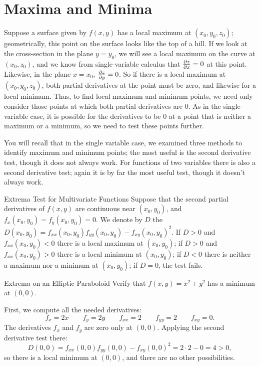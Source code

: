 \section{Maxima and Minima}\label{sec:MultivariateMaximaMinima}

Suppose a surface given by $f(x,y)$ has a local maximum at
$(x_0,y_0,z_0)$; geometrically, this point on the surface looks like
the top of a hill. If we look at the cross-section in the plane
$y=y_0$, we will see a local maximum on the curve at $(x_0,z_0)$, and
we know from single-variable calculus that ${\partial z\over\partial x}=0$
at this point. Likewise, in the plane $x=x_0$, ${\partial
  z\over\partial y}=0$. So if there is a local maximum at
$(x_0,y_0,z_0)$, both partial derivatives at the point must be zero,
and likewise for a local minimum. Thus, to find local maximum and
minimum points, we need only consider those points at which both
partial derivatives are 0. As in the single-variable case, it is
possible for the derivatives to be 0 at a point that is neither a
maximum or a minimum, so we need to test these points further.

You will recall that in the single variable case, we examined three
methods to identify maximum and minimum points; the most useful is the
second derivative test, though it does not always work. For functions
of two variables there is also a second derivative test; again it is
by far the most useful test, though it doesn't always work.

\begin{theorem}{Extrema Test for Multivariate Functions}{}
Suppose that the second partial derivatives of $f(x,y)$ are
continuous near $(x_0,y_0)$, and $f_x(x_0,y_0)=f_y(x_0,y_0)=0$.
We denote by $D$ the 
$D(x_0,y_0)=f_{xx}(x_0,y_0)f_{yy}(x_0,y_0)-f_{xy}(x_0,y_0)^2$.
If $D>0$ and $f_{xx}(x_0,y_0)<0$ there is a local maximum at $(x_0,y_0)$;
if $D>0$ and $f_{xx}(x_0,y_0)>0$ there is a local minimum at $(x_0,y_0)$;
if $D<0$ there is neither a maximum nor a minimum at $(x_0,y_0)$;
if $D=0$, the test fails.
\end{theorem}

\begin{example}{Extrema on an Elliptic Paraboloid}{}
Verify that $f(x,y)=x^2+y^2$ has a minimum at $(0,0)$.
\end{example}
\begin{solution}
First, we compute all the needed derivatives:
$$f_x=2x \qquad f_y=2y \qquad f_{xx}=2 \qquad f_{yy}=2 \qquad
f_{xy}=0.$$
The derivatives $f_x$ and $f_y$ are zero only at $(0,0)$. Applying the
second derivative test there:
$$D(0,0)=f_{xx}(0,0)f_{yy}(0,0)-f_{xy}(0,0)^2=
2\cdot2-0=4>0,$$
so there is a local minimum at $(0,0)$, and there are no other
possibilities. 
\end{solution}

